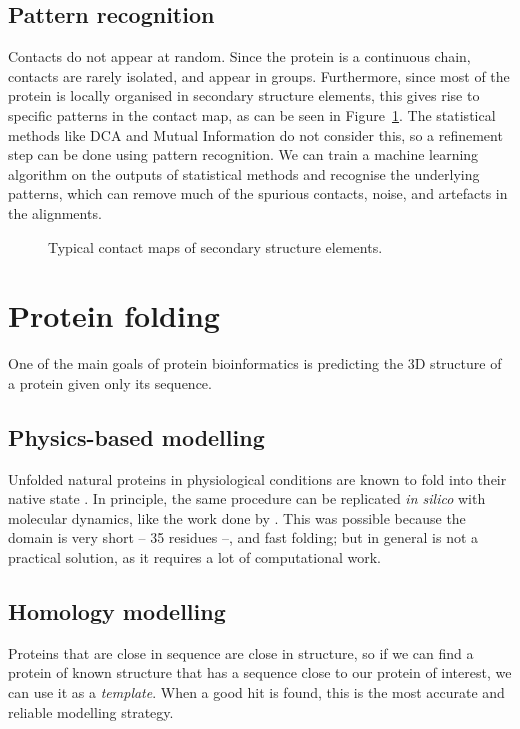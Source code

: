 \subsection{Pattern recognition}
Contacts do not appear at random.
Since the protein is a continuous chain, contacts are rarely isolated, and appear in groups.
Furthermore, since most of the protein is locally organised in secondary structure elements, this gives rise to specific patterns in the contact map, as can be seen in Figure~\ref{fig:contact_patterns}.
The statistical methods like DCA and Mutual Information do not consider this, so a refinement step can be done using pattern recognition.
We can train a machine learning algorithm on the outputs of statistical methods and recognise the underlying patterns, which can remove much of the spurious contacts, noise, and artefacts in the alignments.


\begin{figure}[!htb]
	\centering
	\hfil
	\hfil
	\hfil
	\caption{Typical contact maps of secondary structure elements.}\label{fig:contact_patterns}
\end{figure}


\section{Protein folding}

One of the main goals of protein bioinformatics is predicting the 3D structure of a protein given only its sequence.

\subsection{Physics-based modelling}
Unfolded natural proteins in physiological conditions are known to fold into their native state \citep{fold_graciously}.
In principle, the same procedure can be replicated \emph{in silico} with molecular dynamics, like the work done by \citet{physics_folding}.
This was possible because the domain is very short -- 35 residues --, and fast folding; but in general is not a practical solution, as it requires a lot of computational work.

\subsection{Homology modelling}
Proteins that are close in sequence are close in structure, so if we can find a protein of known structure that has a sequence close to our protein of interest, we can use it as a \emph{template}.
When a good hit is found, this is the most accurate and reliable modelling strategy.

